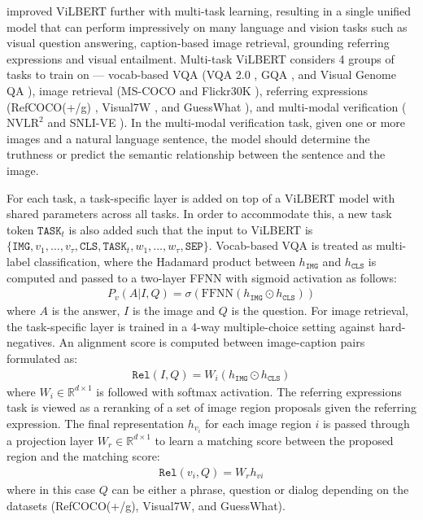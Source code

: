 \documentclass{article}
\begin{document}
\citet{lu2020multitask} improved ViLBERT further with multi-task learning, resulting in a single unified model that can perform impressively on many language and vision tasks such as visual question answering, caption-based image retrieval, grounding referring expressions and visual entailment. Multi-task ViLBERT considers 4 groups of tasks to train on --- vocab-based VQA (VQA 2.0 \citep{goyal2017vqa2}, GQA \citep{hudson2019gqa}, and Visual Genome QA \citep{krishnavisualgenome}), image retrieval (MS-COCO \citep{coco} and Flickr30K \citep{plummer2015vdg}), referring expressions (RefCOCO(+/g) \citep{kazemzadeh-etal-2014-referitgame, maorefcoco}, Visual7W \citep{zhu2016cvpr}, and GuessWhat \citep{guesswhat_game}), and multi-modal verification ($\text{NVLR}^2$ \citep{suhr-etal-2019-corpus} and  SNLI-VE \citep{xie2018visual}). In the multi-modal verification task, given one or more images and a natural language sentence, the model should determine the truthness or predict the semantic relationship between the sentence and the image. 

For each task, a task-specific layer is added on top of a ViLBERT model with shared parameters across all tasks. In order to accommodate this, a new task token $\mathtt{TASK}_{t}$ is also added such that the input to ViLBERT is $\{\mathtt{IMG}, v_{1}, \dots, v_{\tau}, \mathtt{CLS}, \mathtt{TASK}_{t}, w_{1}, \dots, w_{\tau}, \mathtt{SEP}\}$. Vocab-based VQA is treated as multi-label classification, where the Hadamard product between $h_{\mathtt{IMG}}$ and $h_{\mathtt{CLS}}$ is computed and passed to a two-layer FFNN with sigmoid activation as follows:
\begin{align}
    P_{v}(A|I, Q) = \sigma(\text{FFNN}(h_{\mathtt{IMG}} \odot h_{\mathtt{CLS}}))
\end{align}
where $A$ is the answer, $I$ is the image and $Q$ is the question. For image retrieval, the task-specific layer is trained in a 4-way multiple-choice setting against hard-negatives. An alignment score is computed between image-caption pairs formulated as:
\begin{align}
    \mathtt{Rel}(I,Q) = W_{i}(h_{\mathtt{IMG}} \odot h_{\mathtt{CLS}})
\end{align}
where $W_{i} \in \mathbb{R}^{d \times 1}$ is followed with softmax activation. The referring expressions task is viewed as a reranking of a set of image region proposals given the referring expression. The final representation $h_{v_{i}}$ for each image region $i$ is passed through a projection layer $W_{r} \in \mathbb{R}^{d \times 1}$ to learn a matching score between the proposed region and the matching score: 
\begin{align}
    \mathtt{Rel}(v_{i}, Q) = W_{r}h_{vi}
\end{align}
where in this case $Q$ can be either a phrase, question or dialog depending on the datasets (RefCOCO(+/g), Visual7W, and GuessWhat). 
\end{document}
